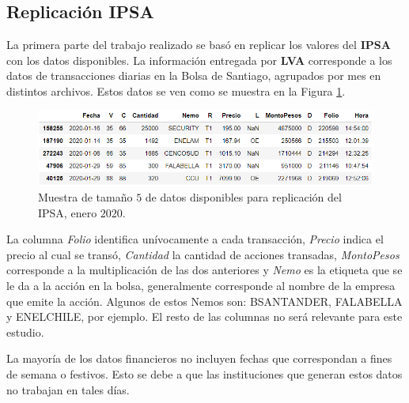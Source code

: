 \documentclass{article}
\begin{document}
\subsection{Replicación IPSA}
   	La primera parte del trabajo realizado se basó en replicar los valores del \textbf{IPSA} con los datos disponibles. La información entregada por \textbf{LVA} corresponde a los datos de transacciones diarias en la Bolsa de Santiago, agrupados por mes en distintos archivos. 
    Estos datos se ven como se muestra en la Figura \ref{fig:trans}.
   	\begin{figure}[H]
   		\centering
   		\includegraphics[scale=.5]{imgs/transacciones_RV_data.png}
   		\caption{Muestra de tamaño $5$ de datos disponibles para replicación del IPSA, enero $2020$.}
   		\label{fig:trans}
   	\end{figure}
    
   	La columna \textit{Folio} identifica unívocamente a cada transacción, \textit{Precio} indica el precio al cual se transó,  \textit{Cantidad} la cantidad de acciones transadas, \textit{MontoPesos} corresponde a la multiplicación de las dos anteriores y \textit{Nemo} es la etiqueta que se le da a la acción en la bolsa, generalmente corresponde al nombre de la empresa que emite la acción. Algunos de estos Nemos son: BSANTANDER, FALABELLA y ENELCHILE, por ejemplo. El resto de las columnas no será relevante para este estudio.\\
   	
   	\begin{remark}
   		La mayoría de los datos financieros no incluyen fechas que correspondan a fines de semana o festivos. Esto se debe a que las instituciones que generan estos datos no trabajan en tales días.
   	\end{remark}
   	
\end{document}
